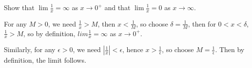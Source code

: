 \begin{example}
    Show that $\lim{\frac{1}{x}}=\infty$ as $x \rightarrow 0^+$ and that $\lim{\frac{1}{x}}=
    0$ as $x \rightarrow \infty$.
\end{example} 
\begin{solution}
    For any $M>0$, we need  $ \frac{1}{x}>M$, then $x<\frac{1}{M}$, so choose 
    $\delta=\frac{1}{M}$, then for $0<x<\delta$,  $ \frac{1}{x}>M$, so by definition, 
    $lim{\frac{1}{x}}=\infty$ as $x \rightarrow 0^+$.

    Similarly, for any  $\epsilon>0$, we need  $|\frac{1}{x}|<\epsilon$, hence 
    $x>\frac{1}{\epsilon}$, so choose $M=\frac{1}{\epsilon}$. Then by definition, the 
    limit follows.
\end{solution}



